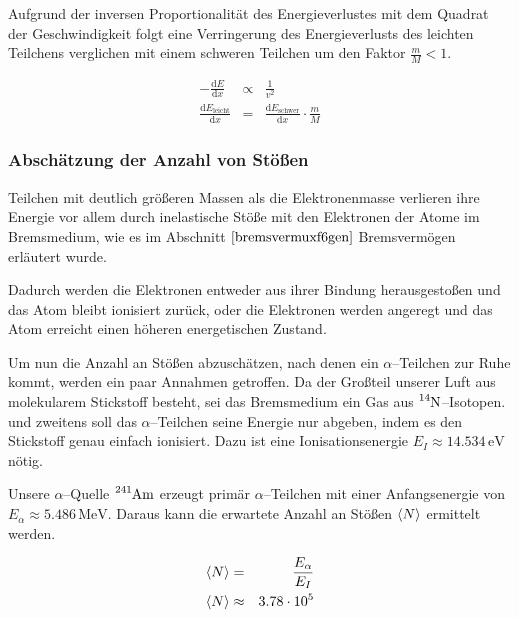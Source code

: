 \documentclass[12pt,a4paper]{scrartcl}
\numberwithin{equation}{section} %
\begin{document}
\noindent
Aufgrund der inversen Proportionalität des Energieverlustes mit dem Quadrat der Geschwindigkeit folgt eine Verringerung des Energieverlusts des leichten Teilchens verglichen mit einem schweren Teilchen um den Faktor $\frac{m}{M} < 1$. \cite{Demtröder}

\begin{eqnarray}
    - \frac{\mathrm dE}{\mathrm dx} &\propto& \frac{1}{v^2} \\
    \frac{\mathrm dE_\mathrm{leicht}}{\mathrm dx}
        &=& \frac{\mathrm dE_\mathrm{schwer}}{\mathrm dx}
            \cdot \frac{m}{M}
\end{eqnarray}

\hypertarget{abschuxe4tzung-der-anzahl-von-stuxf6uxdfen}{%
\subsubsection{Abschätzung der Anzahl von
Stößen}\label{abschuxe4tzung-der-anzahl-von-stuxf6uxdfen}}

Teilchen mit deutlich größeren Massen als die Elektronenmasse verlieren ihre Energie vor allem durch inelastische Stöße mit den Elektronen der Atome im Bremsmedium, wie es im Abschnitt $\ref{bremsvermuxf6gen}$ Bremsvermögen erläutert wurde.

Dadurch werden die Elektronen entweder aus ihrer Bindung herausgestoßen und das Atom bleibt ionisiert zurück, oder die Elektronen werden angeregt und das Atom erreicht einen höheren energetischen Zustand.

Um nun die Anzahl an Stößen abzuschätzen, nach denen ein $\alpha$--Teilchen zur Ruhe kommt, werden ein paar Annahmen getroffen. Da der Großteil unserer Luft aus molekularem Stickstoff besteht, sei das Bremsmedium ein Gas aus $\ce{^{14}N}$--Isotopen. und zweitens soll das $\alpha$--Teilchen seine Energie nur abgeben, indem es den Stickstoff genau einfach ionisiert. Dazu ist eine Ionisationsenergie $E_I\approx 14.534 \mathrm{\,eV}$ nötig. \cite{Ionization Energy}

Unsere $\alpha$--Quelle $\ce{^{241}Am}$ erzeugt primär $\alpha$--Teilchen mit einer Anfangsenergie von $E_\alpha\approx 5.486 \mathrm{\,MeV}$. Daraus kann die erwartete Anzahl an Stößen $\expval{N}$ ermittelt werden.

\begin{eqnarray}
    \expval{N} &=& \frac{E_\alpha}{E_I} \\
    \expval{N} &\approx& 3.78 \cdot 10^5
\end{eqnarray}
\end{document}
